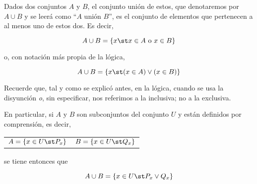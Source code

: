 

Dados dos conjuntos $A$ y $B$, el conjunto unión de estos, que denotaremos
por $A \cup B$ y se leerá como ``$A$ unión $B$'', es el conjunto de
elementos que pertenecen a al menos uno de estos dos. Es decir,

\[ A \cup B = \{x \st x \in A \ \text{o} \ x \in B\} \]

\noindent o, con notación más propia de la lógica,

\[ A \cup B = \{x \st (x \in A) \lor (x \in B)\} \]

\noindent Recuerde que, tal y como se explicó antes, en la lógica, cuando se
usa la disyunción \emph{o}, sin especificar, nos referimos a la inclusiva;
no a la exclusiva.

En particular, si $A$ y $B$ son subconjuntos del conjunto $U$ y están
definidos por comprensión, es decir,

\begin{center}
\begin{tabular}{lr}
  $A = \{x \in U \st P_x\}$
    & $B = \{x \in U \st Q_x\}$
\end{tabular}
\end{center}

\noindent se tiene entonces que

\[ A \cup B = \{x \in U \st P_x \lor Q_x\} \]

